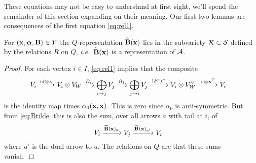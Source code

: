 \documentclass{amsart}
\newcommand{\balpha}{\boldsymbol{\alpha}}
\theoremstyle{definition}
\newcommand\VW{V_W}
\newcommand\Y{Y}
\begin{document}
These equations may not be easy to understand at first sight, we'll spend the remainder of this section expanding on their meaning. Our first two lemmas are consequences of the first equation \eqref{eq:rel1}.

\begin{lemma}\label{lem:rela}
For $(\bfx, \balpha, \bfB) \in \Y$ 
the $Q$-representation $\widetilde{\mathbf{B}}(\mathbf{x})$ lies in the subvariety $\mathcal{R}\subset \mathcal{S}$ defined by the relations $R$ on $Q$, \emph{i.e.}~$\widetilde{\mathbf{B}}(\mathbf{x})$ is a representation of $\mathcal{A}$. 
\end{lemma}

\begin{proof}
For each vertex $i\in I$, \eqref{eq:rel1} implies that the composite
\begin{equation}\label{eq:inR}
    V_{i} \xrightarrow{\textup{id} \otimes \bfx} V_{i} \otimes \VW \xrightarrow{B_{i}} \bigoplus_{i \rightarrow j} V_j \xrightarrow{\Omega_i} \bigoplus_{j \rightarrow i} V_j \xrightarrow{(B^i)^\vee} V_{i} \otimes \VW^\vee \xrightarrow{\textup{id} \otimes \bfx^T} V_i
\end{equation}
is the identity map times $\alpha_0(\mathbf{x},\mathbf{x})$. This is zero since $\alpha_0$ is anti-symmetric. But from \eqref{eq:Btilde} this is also the sum, over all arrows $a$ with tail at $i$, of 
$$ V_{i} \xrightarrow{\widetilde{\mathbf{B}}(\mathbf{x})_a} V_{j} \xrightarrow{\widetilde{\mathbf{B}}(\mathbf{x})_{a'}} V_{i}  $$
where $a'$ is the dual arrow to $a$. The relations on $Q$ are that these sums vanish.
\end{proof}
\end{document}

